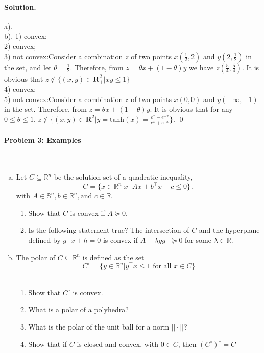\documentclass[a4paper]{article}
\newenvironment{solution}
{\color{blue} \paragraph{Solution.}}
{\newline \qed}
\begin{document}
\begin{solution}
    a).\\
    b). 1) convex;\\2) convex;\\3) not convex:\quad Consider a combination $z$ of two points $x (\frac{1}{2},2)$ and $y (2,\frac{1}{2})$ in the set, and let $\theta=\frac{1}{2}$. Therefore, from $z=\theta x + (1-\theta)y$ we have $z(\frac{5}{4},\frac{5}{4})$. It is obvious that $z \not\in \{  (x,y)\in \mathbf{R}^2_{+} | xy \leq 1 \}$\\4) convex;\\5) not convex:\quad Consider a combination $z$ of two points $x (0,0)$ and $y (-\infty,-1)$ in the set. Therefore, from $z=\theta x + (1-\theta)y$. It is obvious that for any $0 \leq \theta \leq 1$, $z \not\in \{  (x,y)\in \mathbf{R}^2 | y = \text{tanh}(x) = \frac{e^{x}-e^{-x}}{e^{x}+e^{-x}}\}$.
\end{solution}

\paragraph{Problem 3: Examples}
~
\begin{enumerate}[a)]
\item Let $C \subseteq \mathbb{R}^n$ be the solution set of a quadratic inequality,
    \begin{equation}
        C = \{ x\in \mathbb{R}^n | x^\top Ax+b^\top x+c \leq 0\}\,,
    \end{equation}
    with $A \in \mathbb{S}^n, b \in \mathbb{R}^n, \text{and } c \in \mathbb{R}$.

    \noindent
    \begin{enumerate}[1)]
        \item Show that $C$ is convex if $A \succeq 0$.
        \item Is the following statement true? The intersection of $C$ and the hyperplane defined by $g^\top x+h=0$ is convex if $A+\lambda gg^\top \succeq 0$ for some $\lambda \in \mathbb{R}$.
    \end{enumerate}
\item The polar of $C\subseteq \mathbb{R}^n$ is defined as the set
$$C^\circ = \{ y\in \mathbb{R}^n | y^\top x\leq 1 \text{ for all }x \in C\}$$\,
    \noindent
    \begin{enumerate}[1)]
        \item Show that $C^\circ$ is convex.
        \item What is a polar of a polyhedra?
        \item What is the polar of the unit ball for a norm $||\cdot||$?
        \item Show that if $C$ is closed and convex, with $0 \in C$, then $(C^\circ)^\circ = C$
    \end{enumerate}
\end{enumerate}
\end{document}

